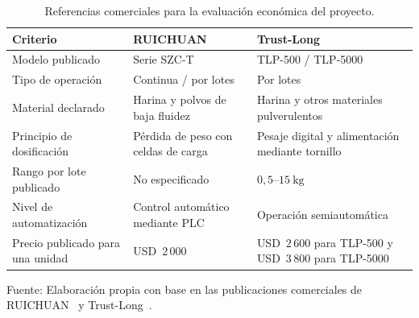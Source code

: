 \begin{table}[H]
    \centering
    \caption{Referencias comerciales para la evaluación económica del proyecto.}
    \label{tab:comparativa_economica}
    \footnotesize
    \setlength{\tabcolsep}{4pt}
    \renewcommand{\arraystretch}{1.35}

    \begin{tabularx}{\textwidth}{
        >{\raggedright\arraybackslash}p{}
        >{\raggedright\arraybackslash}X
        >{\raggedright\arraybackslash}X}
        \toprule[1pt]

        \textbf{Criterio} &
        \textbf{RUICHUAN} &
        \textbf{Trust-Long} \\
        \midrule[1pt]

        Modelo publicado &
        Serie SZC-T &
        TLP-500 / TLP-5000 \\
        \midrule

        Tipo de operación &
        Continua / por lotes &
        Por lotes \\
        \midrule

        Material declarado &
        Harina y polvos de baja fluidez &
        Harina y otros materiales pulverulentos \\
        \midrule

        Principio de dosificación &
        Pérdida de peso con celdas de carga &
        Pesaje digital y alimentación mediante tornillo \\
        \midrule

        Rango por lote publicado &
        No especificado &
        $0{,}5$--$15\ \mathrm{kg}$ \\
        \midrule

        Nivel de automatización &
        Control automático mediante PLC &
        Operación semiautomática \\
        \midrule

        Precio publicado para una unidad &
        USD~$2\,000$ &
        USD~$2\,600$ para TLP-500 y
        USD~$3\,800$ para TLP-5000 \\
        \bottomrule[1pt]
    \end{tabularx}

    \vspace{0.5em}

    {\footnotesize
    Fuente: Elaboración propia con base en las publicaciones comerciales de
    RUICHUAN~\parencite{UnidadDosificadoraGravimetrica} y
    Trust-Long~\parencite{MaquinaLlenadoPolvo}.}
\end{table}

